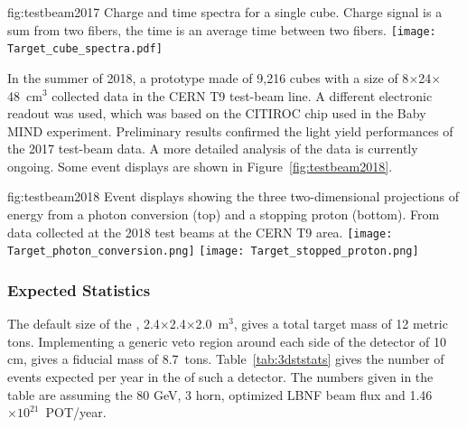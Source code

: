 \begin{dunefigure}{fig:testbeam2017}
{Charge and time spectra for a single  cube. Charge signal is a sum from two fibers, the time is an average time between two fibers.}
  \texttt{[image: Target\_cube\_spectra.pdf]}
\end{dunefigure}

In the summer of 2018, a prototype made of 9,216 cubes with a size of 8$\times$24$\times$48~cm$^{3}$  collected data in the CERN T9 test-beam line.
A different electronic readout was used, which was based on the CITIROC chip used in the Baby MIND experiment.
Preliminary results confirmed the light yield performances of the 2017 test-beam data. A more detailed analysis of the data is currently ongoing.
Some event displays are shown in Figure~\ref{fig:testbeam2018}.


\begin{dunefigure}{fig:testbeam2018}
{Event displays showing the three two-dimensional projections of energy from a photon conversion (top) and a stopping proton (bottom). From data collected at the 2018 test beams at the CERN T9 area.}
\texttt{[image: Target\_photon\_conversion.png]}
\texttt{[image: Target\_stopped\_proton.png]}
\end{dunefigure}

\subsubsection{Expected Statistics}


The default size of the , 2.4$\times$2.4$\times$2.0~m$^{3}$, gives a total target mass of 12 metric tons.  Implementing a generic veto region around each side of the detector of 10 cm, gives a fiducial mass of 8.7~tons.
Table~\ref{tab:3dststats} gives the number of events expected per year in the  of such a  detector.  The numbers given in the table are assuming the 80 GeV, 3 horn, optimized LBNF beam flux and 1.46$\times10^{21}$~POT/year.


